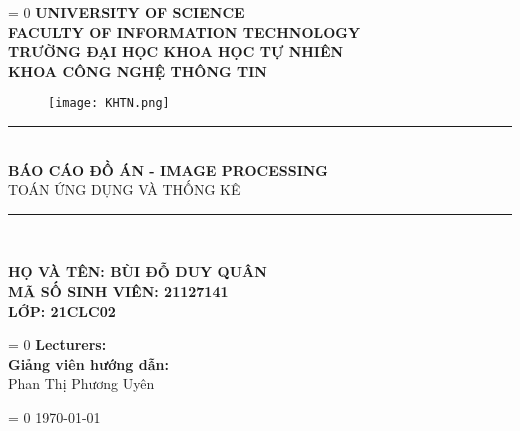 \documentclass{report}
\def\lang{1} %
\begin{document}
\begin{titlepage}



\begin{center}
\ifnum\lang = 0
    \textbf{\Large UNIVERSITY OF SCIENCE}\\[0.2cm]
    \textbf{\Large FACULTY OF INFORMATION TECHNOLOGY}\\
\else
    \textbf{\Large TRƯỜNG ĐẠI HỌC KHOA HỌC TỰ NHIÊN}\\
    \textbf{\Large KHOA CÔNG NGHỆ THÔNG TIN}\\
\fi

\begin{figure}[!h]
    \centering
    \texttt{[image: KHTN.png]}
\end{figure}

\rule{\textwidth}{1pt} \\[0.4cm]
{\huge \bfseries BÁO CÁO ĐỒ ÁN - IMAGE PROCESSING}\\[0.4cm]
\textsc{\Large TOÁN ỨNG DỤNG VÀ THỐNG KÊ}
\rule{\textwidth}{1pt} \\[2cm]

\begin{center}
    \textbf{\Large HỌ VÀ TÊN: BÙI ĐỖ DUY QUÂN}\\[0.5cm]
    \textbf{\Large MÃ SỐ SINH VIÊN: 21127141}\\[0.5cm]
    \textbf{\Large LỚP: 21CLC02}\\[2cm]
\end{center}

\begin{center}
    \ifnum\lang = 0
        \textbf{\Large Lecturers: \\[0.2cm]}
    \else
        \textbf{\Large Giảng viên hướng dẫn: \\[0.2cm]}
    \fi
    \Large{Phan Thị Phương Uyên}
\end{center}
\vfill

\ifnum\lang = 0
\fi
{\large \today}
\end{center}
\end{titlepage}
\end{document}
